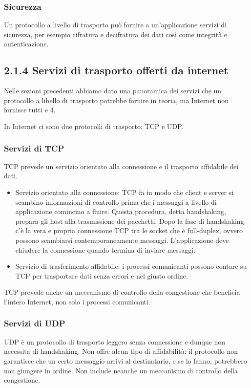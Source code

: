 \documentclass{book}
\begin{document}
\subsubsection*{Sicurezza}
Un protocollo a livello di trasporto può fornire a un'applicazione servizi di sicurezza, per esempio cifratura e decifratura dei dati così come integrità e autenticazione.

\subsection{2.1.4 Servizi di trasporto offerti da internet}
Nelle sezioni precedenti abbiamo dato una panoramica dei servizi che un protocollo a libello di trasporto potrebbe fornire in teoria, ma Internet non fornisce tutti e 4.

In Internet ci sono due protocolli di trasporto: TCP e UDP.

\subsubsection*{Servizi di TCP}
TCP prevede un servizio orientato alla connessione e il trasporto affidabile dei dati.

\begin{itemize}
	\item Servizio orientato alla connessione: TCP fa in modo che client e server si scambino informazioni di controllo prima che i messaggi a livello di applicazione comincino a fluire. Questa procedura, detta handshaking, prepara gli host alla trasmissione dei pacchetti. Dopo la fase di handshaking c'è la vera e propria connessione TCP tra le socket che è full-duplex, ovvero possono scambiarsi contemporaneamente messaggi. L'applicazione deve chiudere la connessione quando termina di inviare messaggi.
	
	\item Servizio di trasferimento affidabile: i processi comunicanti possono contare su TCP per trasportare dati senza errori e nel giusto ordine.
\end{itemize}

TCP prevede anche un meccanismo di controllo della congestione che beneficia l'intero Internet, non solo i processi comunicanti.

\subsubsection*{Servizi di UDP}
UDP è un protocollo di trasporto leggero senza connessione e dunque non necessita di handshaking. Non offre alcun tipo di affidabilità: il protocollo non garantisce che un certo messaggio arrivi al destinatario, e se lo fanno, potrebbero non giungere in ordine. Non include neanche un meccanismo di controllo della congestione.
\end{document}
